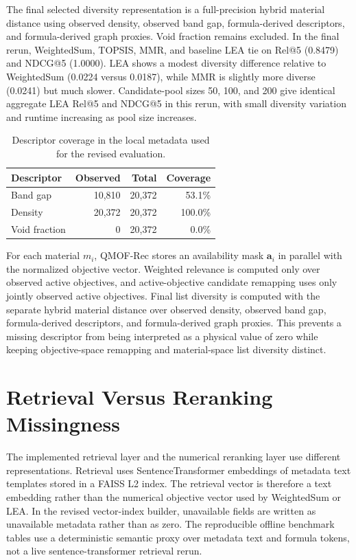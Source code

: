 \documentclass[12pt,a4paper]{article}
\begin{document}
The final selected diversity representation is a full-precision hybrid material distance using observed density, observed band gap, formula-derived descriptors, and formula-derived graph proxies. Void fraction remains excluded. In the final rerun, WeightedSum, TOPSIS, MMR, and baseline LEA tie on Rel@5 (0.8479) and NDCG@5 (1.0000). LEA shows a modest diversity difference relative to WeightedSum (0.0224 versus 0.0187), while MMR is slightly more diverse (0.0241) but much slower. Candidate-pool sizes 50, 100, and 200 give identical aggregate LEA Rel@5 and NDCG@5 in this rerun, with small diversity variation and runtime increasing as pool size increases.

\begin{table}[H]
\centering
\caption{Descriptor coverage in the local metadata used for the revised evaluation.}
\label{tab:s_descriptor_coverage}
\small
\begin{tabular}{lrrr}
\toprule
\textbf{Descriptor} & \textbf{Observed} & \textbf{Total} & \textbf{Coverage}\\
\midrule
Band gap & 10{,}810 & 20{,}372 & 53.1\%\\
Density & 20{,}372 & 20{,}372 & 100.0\%\\
Void fraction & 0 & 20{,}372 & 0.0\%\\
\bottomrule
\end{tabular}
\end{table}

For each material $m_i$, QMOF-Rec stores an availability mask $\mathbf{a}_i$ in parallel with the normalized objective vector. Weighted relevance is computed only over observed active objectives, and active-objective candidate remapping uses only jointly observed active objectives. Final list diversity is computed with the separate hybrid material distance over observed density, observed band gap, formula-derived descriptors, and formula-derived graph proxies. This prevents a missing descriptor from being interpreted as a physical value of zero while keeping objective-space remapping and material-space list diversity distinct.

\section*{Retrieval Versus Reranking Missingness}

The implemented retrieval layer and the numerical reranking layer use different representations. Retrieval uses SentenceTransformer embeddings of metadata text templates stored in a FAISS L2 index. The retrieval vector is therefore a text embedding rather than the numerical objective vector used by WeightedSum or LEA. In the revised vector-index builder, unavailable fields are written as unavailable metadata rather than as zero. The reproducible offline benchmark tables use a deterministic semantic proxy over metadata text and formula tokens, not a live sentence-transformer retrieval rerun.
\end{document}
